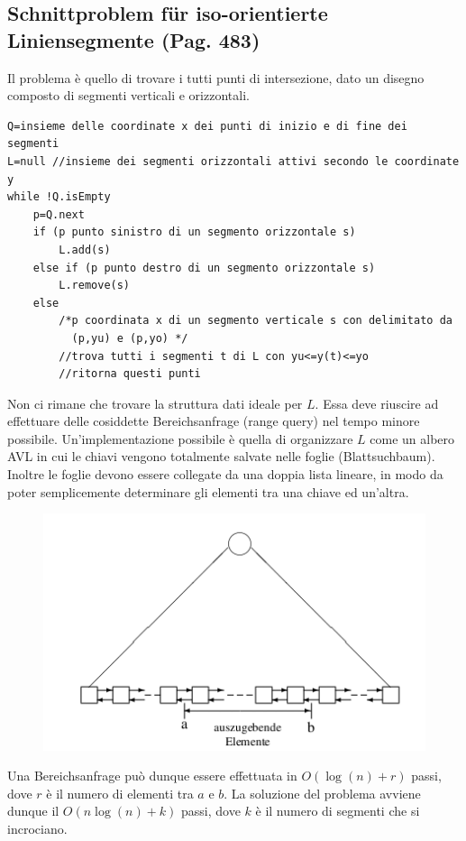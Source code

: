 \documentclass[a4paper]{book}
\newcommand{\lstIndent}{4}
\begin{document}
\subsection{Schnittproblem für iso-orientierte Liniensegmente (Pag. 483)}
Il problema è quello di trovare i tutti punti di intersezione, dato un disegno composto di segmenti verticali e orizzontali.
\begin{lstlisting}[tabsize=\lstIndent]
Q=insieme delle coordinate x dei punti di inizio e di fine dei segmenti
L=null //insieme dei segmenti orizzontali attivi secondo le coordinate y
while !Q.isEmpty
	p=Q.next
	if (p punto sinistro di un segmento orizzontale s)
		L.add(s)
	else if (p punto destro di un segmento orizzontale s)
		L.remove(s)
	else 
		/*p coordinata x di un segmento verticale s con delimitato da
		  (p,yu) e (p,yo) */
		//trova tutti i segmenti t di L con yu<=y(t)<=yo
		//ritorna questi punti   		
\end{lstlisting}
Non ci rimane che trovare la struttura dati ideale per $L$. Essa deve riuscire ad effettuare delle cosiddette Bereichsanfrage (range query) nel tempo minore possibile. Un'implementazione possibile è quella di organizzare $L$ come un albero AVL in cui le chiavi vengono totalmente salvate nelle foglie (Blattsuchbaum). Inoltre le foglie devono essere collegate da una doppia lista lineare, in modo da poter semplicemente determinare gli elementi tra una chiave ed un'altra.
\begin{figure}[H]
\centering
\includegraphics[scale=0.5]{Figures/blattsuchbaum.png}
\end{figure}
Una Bereichsanfrage può dunque essere effettuata in $O(\log (n)+r)$ passi, dove $r$ è il numero di elementi tra $a$ e $b$. La soluzione del problema avviene dunque il $O(n\log (n)+k)$ passi, dove $k$ è il numero di segmenti che si incrociano.
\end{document}
